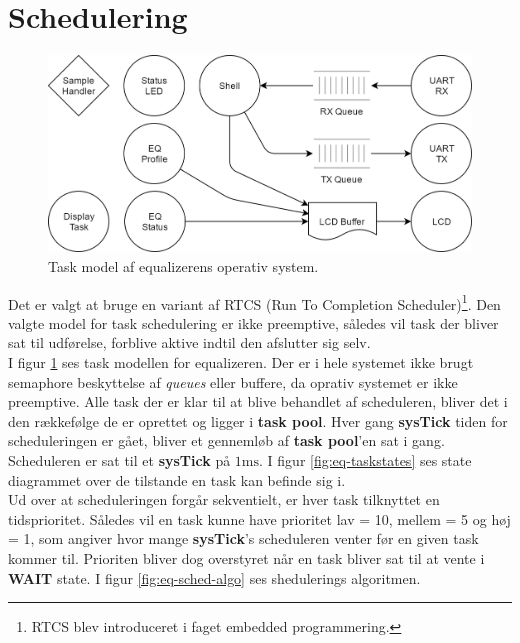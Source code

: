 \section{Schedulering}

\begin{figure}[h!]
	\centering
	\includegraphics[width=.7\textwidth]{billeder/eq-one.png}
	\caption{Task model af equalizerens operativ system.}
	\label{fig:eq-taskmodel}
\end{figure}

Det er valgt at bruge en variant af RTCS (Run To Completion Scheduler)\footnote{RTCS blev introduceret i faget embedded programmering.}. 
Den valgte model for task schedulering er ikke preemptive, således vil task der bliver sat til udførelse, forblive aktive indtil den afslutter sig selv. \\

I figur \ref{fig:eq-taskmodel} ses task modellen for equalizeren. 
Der er i hele systemet ikke brugt semaphore beskyttelse af \textit{queues} eller buffere, da oprativ systemet er ikke preemptive.
Alle task der er klar til at blive behandlet af scheduleren, bliver det i den rækkefølge de er oprettet og ligger i \textbf{task pool}. Hver gang \textbf{sysTick} tiden for scheduleringen er gået, bliver et gennemløb af \textbf{task pool}'en sat i gang. Scheduleren er sat til et \textbf{sysTick} på $1\si{\milli\second}$.
I figur \ref{fig:eq-taskstates} ses state diagrammet over de tilstande en task kan befinde sig i.\\

Ud over at scheduleringen forgår sekventielt, er hver task tilknyttet en tidsprioritet. 
Således vil en task kunne have prioritet lav = 10, mellem = 5 og høj = 1, som angiver hvor mange \textbf{sysTick}'s scheduleren venter før en given task kommer til.
Prioriten bliver dog overstyret når en task bliver sat til at vente i \textbf{WAIT} state. 
I figur \ref{fig:eq-sched-algo} ses shedulerings algoritmen.

